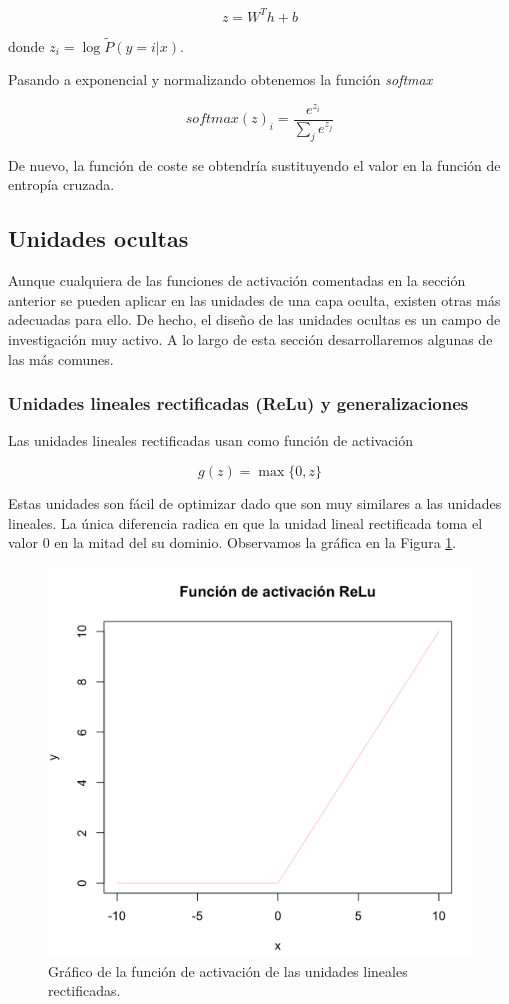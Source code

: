 		$$
			z = W^Th +b
		$$
		
		donde $z_i = \log \tilde{P}(y = i | x)$. 
		
		Pasando a exponencial y normalizando obtenemos la función \textit{softmax}
		
		$$
			softmax(z)_i = \frac{e^{z_i}}{\sum_{j} e^{z_j}}
		$$
		
		De nuevo, la función de coste se obtendría sustituyendo el valor en la función de entropía cruzada.

	\subsection{Unidades ocultas}
	
	Aunque cualquiera de las funciones de activación comentadas en la sección anterior se pueden aplicar en las unidades de una capa oculta, existen otras más adecuadas para ello. De hecho, el diseño de las unidades ocultas es un campo de investigación muy activo. A lo largo de esta sección desarrollaremos algunas de las más comunes.
	
	\subsubsection{Unidades lineales rectificadas (ReLu) y generalizaciones}
	 
	 Las unidades lineales rectificadas usan como función de activación
	 
	 $$
		 g(z) = \max\{0,z\}
	 $$
	 
	 Estas unidades son fácil de optimizar dado que son muy similares a las unidades lineales. La única diferencia radica en que la unidad lineal rectificada toma el valor 0 en la mitad del su dominio. Observamos la gráfica en la Figura \ref{fig:relu}.
	 
	 \begin{figure}[h!]
	 	\centering
	 	\includegraphics[width=0.7\linewidth]{imagenes/relu}
	 	\caption{Gráfico de la función de activación de las unidades lineales rectificadas.}
	 	\label{fig:relu}
	 \end{figure}
 
